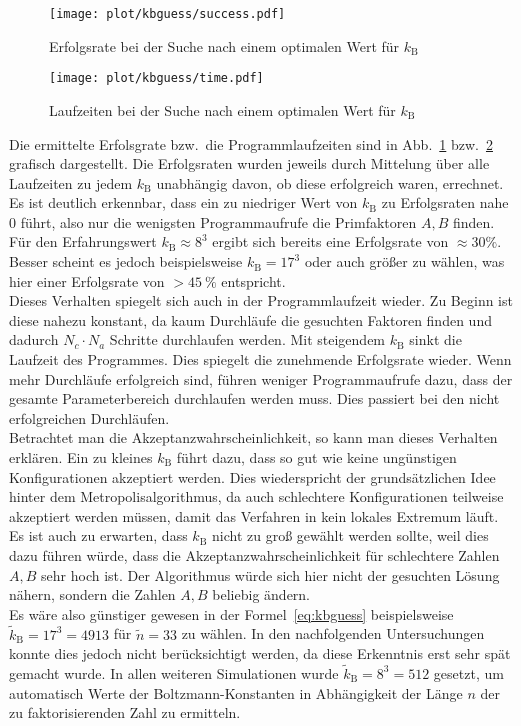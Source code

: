 \begin{figure}[h!]
		\centering
		\texttt{[image: plot/kbguess/success.pdf]}
		\caption{Erfolgsrate bei der Suche nach einem optimalen Wert für $k_\mathrm{B}$}\label{fig:kbguess-success}
\end{figure}
\begin{figure}[h!]
		\centering
		\texttt{[image: plot/kbguess/time.pdf]}
		\caption{Laufzeiten bei der Suche nach einem optimalen Wert für $k_\mathrm{B}$}\label{fig:kbguess-runtime}
\end{figure}
Die ermittelte Erfolsgrate bzw.\ die Programmlaufzeiten sind in Abb.~\ref{fig:kbguess-success} bzw.~\ref{fig:kbguess-runtime} grafisch dargestellt. Die Erfolgsraten wurden jeweils durch Mittelung über alle Laufzeiten zu jedem $k_\mathrm{B}$ unabhängig davon, ob diese erfolgreich waren, errechnet. \\
Es ist deutlich erkennbar, dass ein zu niedriger Wert von $k_\mathrm{B}$ zu Erfolgsraten nahe $0$ führt, also nur die wenigsten Programmaufrufe die Primfaktoren $A,B$ finden. Für den Erfahrungswert $k_\mathrm{B}\approx 8^3$ ergibt sich bereits eine Erfolgsrate von $\approx30\%$. Besser scheint es jedoch beispielsweise $k_\mathrm{B}=17^3$ oder auch größer zu wählen, was hier einer Erfolgsrate von $>\SI{45}{\percent}$ entspricht. \\
Dieses Verhalten spiegelt sich auch in der Programmlaufzeit wieder. Zu Beginn ist diese nahezu konstant, da kaum Durchläufe die gesuchten Faktoren finden und dadurch $N_c\cdot N_a$ Schritte durchlaufen werden. Mit steigendem $k_\mathrm{B}$ sinkt die Laufzeit des Programmes. Dies spiegelt die zunehmende Erfolgsrate wieder. Wenn mehr Durchläufe erfolgreich sind, führen weniger Programmaufrufe dazu, dass der gesamte Parameterbereich durchlaufen werden muss. Dies passiert bei den nicht erfolgreichen Durchläufen. \\
Betrachtet man die Akzeptanzwahrscheinlichkeit, so kann man dieses Verhalten erklären. Ein zu kleines $k_\mathrm{B}$ führt dazu, dass so gut wie keine ungünstigen Konfigurationen akzeptiert werden. Dies wiederspricht der grundsätzlichen Idee hinter dem Metropolisalgorithmus, da auch schlechtere Konfigurationen teilweise akzeptiert werden müssen, damit das Verfahren in kein lokales Extremum läuft. Es ist auch zu erwarten, dass $k_\mathrm{B}$ nicht zu groß gewählt werden sollte, weil dies dazu führen würde, dass die Akzeptanzwahrscheinlichkeit für schlechtere Zahlen $A, B$ sehr hoch ist. Der Algorithmus würde sich hier nicht der gesuchten Lösung nähern, sondern die Zahlen $A, B$ beliebig ändern. \\
Es wäre also günstiger gewesen in der Formel~\eqref{eq:kbguess} beispielsweise $\tilde{k}_\mathrm{B}=17^3=4913$ für $\tilde{n}=33$ zu wählen. In den nachfolgenden Untersuchungen konnte dies jedoch nicht berücksichtigt werden, da diese Erkenntnis erst sehr spät gemacht wurde. In allen weiteren Simulationen wurde $\tilde{k}_\mathrm{B}=8^3=512$ gesetzt, um automatisch Werte der Boltzmann-Konstanten in Abhängigkeit der Länge $n$ der zu faktorisierenden Zahl zu ermitteln.

